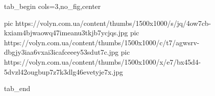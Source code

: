  
 
 
 
 


\ifcmt
  tab_begin cols=3,no_fig,center

     pic https://volyn.com.ua/content/thumbs/1500x1000/s/jq/4ow7cb-kxiam4bjwaowq47imeanu3tkjb7ycjqs.jpg
		 pic https://volyn.com.ua/content/thumbs/1500x1000/c/t7/agwsrv-dbgjy3iaa6vxai3icafceeey53sdut7c.jpg
		 pic https://volyn.com.ua/content/thumbs/1500x1000/x/e7/bx45d4-5dvzl42ougbup7z7k3dlg46evetyje7x.jpg

  tab_end
\fi
